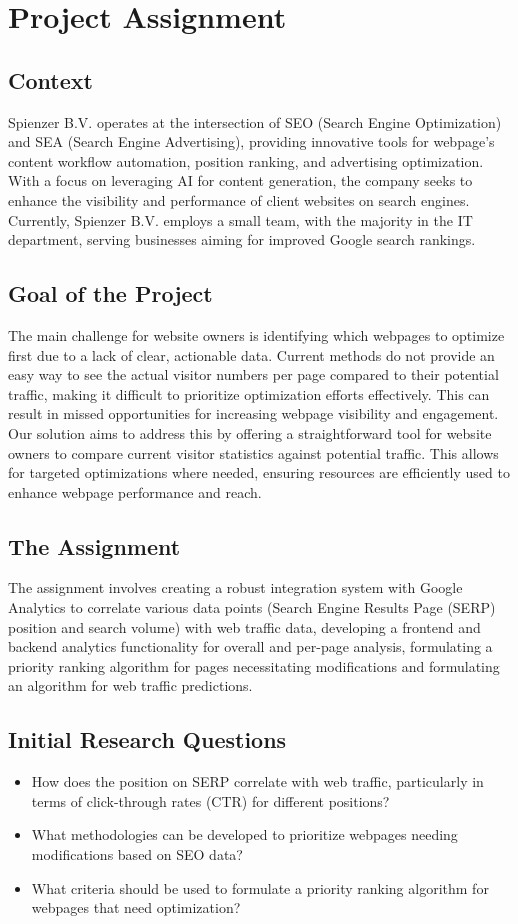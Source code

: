\documentclass[12pt,a4paper]{article}
\begin{document}
\newpage
\setcounter{page}{1}
\section{Project Assignment}
\subsection{Context}
Spienzer B.V. operates at the intersection of SEO (Search Engine Optimization) and SEA (Search Engine Advertising), providing innovative tools for webpage’s content workflow automation, position ranking, and advertising optimization. With a focus on leveraging AI for content generation, the company seeks to enhance the visibility and performance of client websites on search engines. Currently, Spienzer B.V. employs a small team, with the majority in the IT department, serving businesses aiming for improved Google search rankings.
\subsection{Goal of the Project}
The main challenge for website owners is identifying which webpages to optimize first due to a lack of clear, actionable data. Current methods do not provide an easy way to see the actual visitor numbers per page compared to their potential traffic, making it difficult to prioritize optimization efforts effectively. This can result in missed opportunities for increasing webpage visibility and engagement.\\

Our solution aims to address this by offering a straightforward tool for website owners to compare current visitor statistics against potential traffic. This allows for targeted optimizations where needed, ensuring resources are efficiently used to enhance webpage performance and reach.
\subsection{The Assignment}
The assignment involves creating a robust integration system with Google Analytics to correlate various data points (Search Engine Results Page (SERP) position and search volume) with web traffic data, developing a frontend and backend analytics functionality for overall and per-page analysis, formulating a priority ranking algorithm for pages necessitating modifications and formulating an algorithm for web traffic predictions.
\subsection{Initial Research Questions}
\begin{itemize}
    \item How does the position on SERP correlate with web traffic, particularly in terms of click-through rates (CTR) for different positions?
    \item What methodologies can be developed to prioritize webpages needing modifications based on SEO data?
    \item What criteria should be used to formulate a priority ranking algorithm for webpages that need optimization?
\end{itemize}
\end{document}
